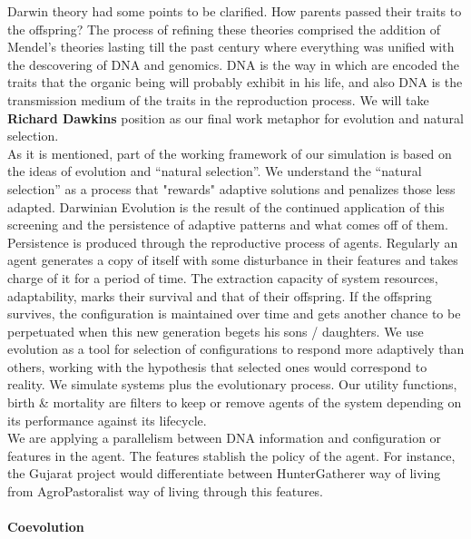 \documentclass[11pt,oneside,a4paper,openright]{report}
\begin{document}
Darwin theory had some points to be clarified. How parents passed their traits to the offspring?
The process of refining these theories comprised the addition of Mendel's theories lasting till 
the past century where everything was unified with the descovering of DNA and genomics. DNA is the 
way in which are encoded the traits that the organic being will probably exhibit in his life, and 
also DNA is the transmission medium of the traits in the reproduction process. We will take \textbf{Richard Dawkins} 
position as our final work metaphor for evolution and natural selection\cite{Dawkins1990}.\\ 
As it is mentioned, part of the working framework of our simulation is based on the ideas of evolution and ``natural selection''. We understand the ``natural selection'' as a process that "rewards" adaptive solutions and penalizes those less adapted. Darwinian Evolution is the result of the continued application of this screening and the persistence of adaptive patterns and what comes off of them. Persistence is produced through the reproductive process of agents. Regularly an agent generates a copy of itself with some disturbance in their features and takes charge of it for a period of time. The extraction capacity of system resources, adaptability,  marks their survival and that of their offspring. If the offspring survives, the configuration is maintained over time and gets another chance to be perpetuated when this new generation begets his sons / daughters. We use evolution as a tool for selection of configurations to respond more adaptively than others, working with the hypothesis that selected ones would correspond to reality. We simulate systems plus the evolutionary process. Our utility functions, birth \& mortality are filters to keep or remove agents of the system depending on its performance against its lifecycle.\\ 
We are applying a parallelism between DNA information and configuration or features in the agent. The features stablish
the policy of the agent. For instance, the Gujarat project would differentiate between HunterGatherer way of living from AgroPastoralist way of living through this features.
\\ 
\paragraph{Coevolution}
\end{document}
